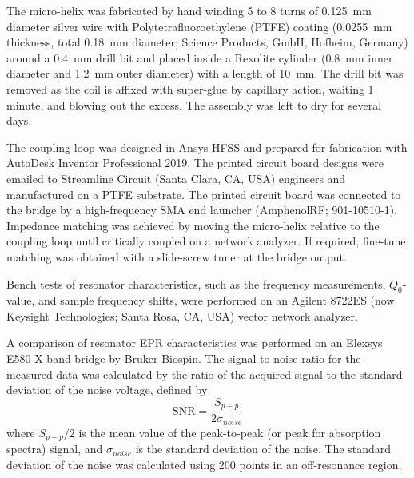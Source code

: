The micro-helix was fabricated by hand winding 5 to 8 turns of 0.125~mm diameter silver wire with Polytetrafluoroethylene (PTFE) coating (0.0255~mm thickness, total 0.18~mm diameter; Science Products, GmbH, Hofheim, Germany) around a 0.4~mm drill bit and placed inside a Rexolite cylinder (0.8~mm inner diameter and 1.2~mm outer diameter) with a length of 10~mm. The drill bit was removed as the coil is affixed with super-glue by capillary action, waiting 1 minute, and blowing out the excess. The assembly was left to dry for several days. 

The coupling loop was designed in Ansys HFSS and prepared for fabrication with AutoDesk Inventor Professional 2019. The printed circuit board designs were emailed to Streamline Circuit (Santa Clara, CA, USA) engineers and manufactured on a PTFE substrate. The printed circuit board was connected to the bridge by a high-frequency SMA end launcher (AmphenolRF; 901-10510-1). Impedance matching was achieved by moving the micro-helix relative to the coupling loop until critically coupled on a network analyzer. If required, fine-tune matching was obtained with a slide-screw tuner at the bridge output. 

Bench tests of resonator characteristics, such as the frequency measurements, $Q_0$-value, and sample frequency shifts, were performed on an Agilent 8722ES (now Keysight Technologies; Santa Rosa, CA, USA) vector network analyzer.

A comparison of resonator EPR characteristics was performed on an Elexsys E580 X-band bridge by Bruker Biospin. The signal-to-noise ratio for the measured data was calculated by the ratio of the acquired signal to the standard deviation of the noise voltage, defined by
\begin{equation}
 \text{SNR}=\frac{S_{p\!-\!p}}{2\sigma_{noise}}
\end{equation}
where $S_{p\!-\!p}/2$ is the mean value of the peak-to-peak (or peak for absorption spectra) signal, and $\sigma_{noise}$ is the standard deviation of the noise. \cite{schroeder2000astronomical, oppenheim1999discrete} The standard deviation of the noise was calculated using 200 points in an off-resonance region.

